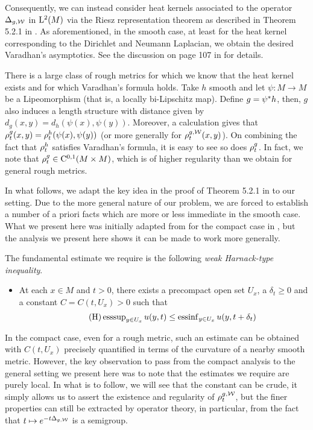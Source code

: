 \documentclass[a4paper, 12pt]{amsart}
\begin{document}
Consequently, we can instead consider heat kernels
associated to the operator $\Delta_{g,\mathcal{W}}$ in ${\rm L}^{2}_{\rm {}}(M)$
via the Riesz representation theorem as described in Theorem 
5.2.1 in \cite{Davies}. As aforementioned, in the smooth case,
at least for the heat kernel corresponding to the 
Dirichlet and Neumann Laplacian, we obtain the desired  Varadhan's
asymptotics. See the discussion on page 107 in \cite{ERS} for details.

There is a large class of rough metrics
for which we know that the heat kernel exists
and for which Varadhan's formula holds. 
Take $h$ smooth and let $\psi:M \to M$
be a Lipeomorphism (that is, a locally bi-Lipschitz map).
Define $g = {\psi}^\ast h$, then, $g$ 
also induces a length structure with 
distance given by $d_g(x,y) = d_h(\psi(x), \psi(y))$.
Moreover, a calculation gives
that $\rho^{g}_t(x,y) = \rho^{h}_t(\psi(x), \psi(y))$
(or more generally for $\rho^{g,\mathcal{W}}_t(x,y)$). 
On combining the fact that $\rho^h_t$ satisfies
Varadhan's formula, it is easy to see
so does $\rho^{g}_t$. In fact, we 
note that $\rho^g_t \in {\rm C}^{0,1}_{\rm {}}(M \times M)$,
which is of higher regularity than we
obtain for general rough metrics.

In what follows, we adapt the key idea in 
the proof of Theorem 5.2.1 in \cite{Davies}
to our setting. Due to the more general 
nature of our problem, we are forced to 
establish a number of a priori facts which 
are more or less immediate in the smooth case.
What we present here was initially adapted from \cite{SC} 
for the compact case in \cite{BCont}, but 
the analysis we present here shows it can be made to work more generally. 

The fundamental estimate we
require is the following \emph{weak Harnack-type inequality}.
\begin{itemize}
\item[] At each $x \in M$ and $t > 0$, there exists a precompact
open set $U_x$, a $\delta_t \geq 0$ and a constant $C = C(t, U_x)  > 0$ such that
\begin{equation}
\tag{H}
\label{eq:Harnack}
\operatorname{esssup}_{y \in U_x} u(y,t) 
	\leq \operatorname{essinf}_{y \in U_x} u(y, t + \delta_t)
\end{equation}
\end{itemize}

In the compact case, even for a
rough metric, such an estimate can be
obtained with $C(t,U_x)$ precisely quantified
in terms of the curvature of a nearby smooth metric.
However, the key observation to pass from the compact analysis
to the general setting we present here was to note that
the estimates we require are purely local. In 
what is to follow, we will see that the constant can be
crude, it simply allows us to assert the existence and regularity
of $\rho^{g,\mathcal{W}}_t$, but the finer properties can still 
be extracted by operator theory, in particular, from the 
fact that $t \mapsto e^{-t\Delta_{g,\mathcal{W}}}$ is a semigroup.
\end{document}
